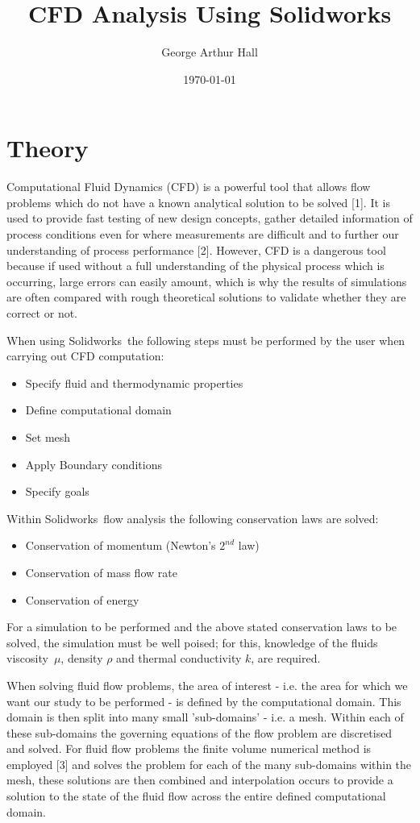 \documentclass[a4paper,11pt,onecolumn]{article}
\author{George Arthur Hall}
\title{CFD Analysis Using Solidworks\textregistered}
\date{\today}
\begin{document}
\section{Theory}

Computational Fluid Dynamics (CFD) is a powerful tool that allows
flow problems
which do not have a known analytical solution to be solved [1]. It is
used to provide fast testing of new design concepts, gather detailed
information of process conditions even for where measurements are difficult and
to further our understanding of process performance [2]. However, CFD is
a dangerous tool because if used without a full understanding of the physical
process which is occurring, large errors can easily amount, which is why the
results of simulations are often compared with rough theoretical solutions to
validate whether they are correct or not. 


When using Solidworks\textregistered~the following steps must
be performed by the user when carrying out CFD computation:
\begin{itemize}
\renewcommand\labelitemi{--}
\item Specify fluid and thermodynamic properties 
\item Define computational domain
\item Set mesh
\item Apply Boundary conditions
\item Specify goals
\end{itemize}


Within Solidworks\textregistered~flow analysis the following conservation laws
are solved:
\begin{itemize}
\renewcommand\labelitemi{--}
\item Conservation of momentum (Newton's $2^{nd}$ law)
\item Conservation of mass flow rate 
\item Conservation of energy 
\end{itemize}


For a simulation to be performed and the above stated conservation laws to be
solved, the simulation must be well poised; for this, knowledge of the fluids
viscosity~$\mu$, density $\rho$ and thermal conductivity $k$, are required.


When solving fluid flow problems, the area of interest - i.e. the area for
which we want our study to be performed - is defined by the computational
domain. This domain is then split into many small 'sub-domains' - i.e. a
mesh. Within each of these sub-domains the governing equations of the flow
problem
are discretised and solved. For fluid flow problems the finite volume numerical
method is employed [3] and solves the problem for each of the many sub-domains
within the mesh, these solutions are then combined and interpolation occurs to
provide a solution to the state of the fluid flow across the entire defined
computational domain.
\end{document}
